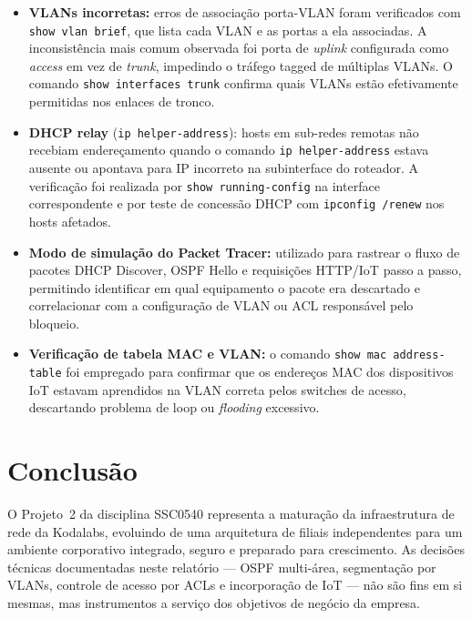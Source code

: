 \documentclass[12pt,a4paper]{article}
\begin{document}
\begin{itemize}
    \item \textbf{VLANs incorretas:} erros de associação porta-VLAN foram verificados
    com \texttt{show vlan brief}, que lista cada VLAN e as portas a ela associadas.
    A inconsistência mais comum observada foi porta de \textit{uplink} configurada
    como \textit{access} em vez de \textit{trunk}, impedindo o tráfego tagged de
    múltiplas VLANs. O comando \texttt{show interfaces trunk} confirma quais VLANs
    estão efetivamente permitidas nos enlaces de tronco.

    \item \textbf{DHCP relay} (\texttt{ip helper-address}): hosts em sub-redes
    remotas não recebiam endereçamento quando o comando
    \texttt{ip helper-address} estava ausente ou apontava para IP incorreto na
    subinterface do roteador. A verificação foi realizada por \texttt{show
    running-config} na interface correspondente e por teste de concessão DHCP com
    \texttt{ipconfig /renew} nos hosts afetados.

    \item \textbf{Modo de simulação do Packet Tracer:} utilizado para rastrear
    o fluxo de pacotes DHCP Discover, OSPF Hello e requisições HTTP/IoT passo a
    passo, permitindo identificar em qual equipamento o pacote era descartado e
    correlacionar com a configuração de VLAN ou ACL responsável pelo bloqueio.

    \item \textbf{Verificação de tabela MAC e VLAN:} o comando
    \texttt{show mac address-table} foi empregado para confirmar que os endereços
    MAC dos dispositivos IoT estavam aprendidos na VLAN correta pelos switches de
    acesso, descartando problema de loop ou \textit{flooding} excessivo.
\end{itemize}

\section{Conclusão}

O Projeto~2 da disciplina SSC0540 representa a maturação da infraestrutura de rede
da Kodalabs, evoluindo de uma arquitetura de filiais independentes para um ambiente
corporativo integrado, seguro e preparado para crescimento. As decisões técnicas
documentadas neste relatório — OSPF multi-área, segmentação por VLANs, controle de
acesso por ACLs e incorporação de IoT — não são fins em si mesmas, mas instrumentos
a serviço dos objetivos de negócio da empresa.
\end{document}
